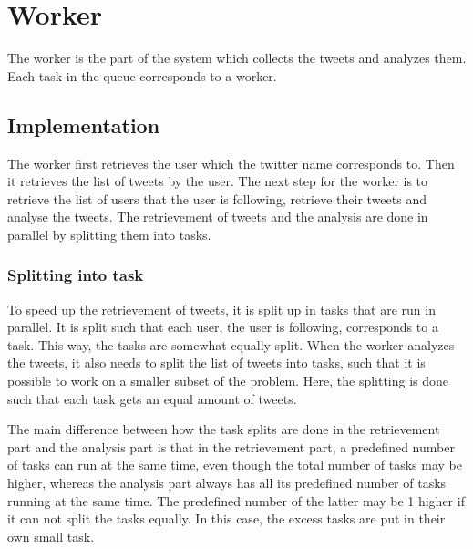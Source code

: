 \chapter{Worker}\label{workerLabel}
The worker is the part of the system which collects the tweets and analyzes
them. Each task in the queue corresponds to a worker. 

\section{Implementation}
The worker first retrieves the user which the twitter name corresponds to. Then
it retrieves the list of tweets by the user. The next step for the
worker is to retrieve the list of users that the user is following, retrieve
their tweets and analyse the tweets. The retrievement of tweets and the
analysis are done in parallel by splitting them into tasks.

\subsection{Splitting into task}
To speed up the retrievement of tweets, it is split up in tasks that are run in
parallel. It is split such that each user, the user is following, corresponds
to a task. This way, the tasks are somewhat equally split. 
When the worker analyzes the tweets, it also needs to split the list of tweets
into tasks, such that it is possible to work on a smaller subset of the
problem. Here, the splitting is done such that each task gets an equal amount of
tweets.

The main difference between how the task splits are done in the retrievement
part and the analysis part is that in the retrievement part, a predefined number
of tasks can run at the same time, even though the total number of tasks may be
higher, whereas the analysis part always has all its predefined number of tasks
running at the same time. The predefined number of the latter may be 1 higher if
it can not split the tasks equally. In this case, the excess tasks are
put in their own small task.

